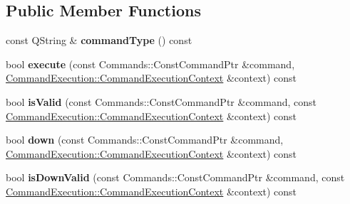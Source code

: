 \subsection*{Public Member Functions}
\begin{DoxyCompactItemize}
\item 
\mbox{\label{class_q_sql_migrator_1_1_command_execution_1_1_custom_command_service_a8c7a42129a19d3121fbfcc5d710b666d}} 
const Q\+String \& {\bfseries command\+Type} () const
\item 
\mbox{\label{class_q_sql_migrator_1_1_command_execution_1_1_custom_command_service_a66b40615960798c7f31f351a88b9af7f}} 
bool {\bfseries execute} (const Commands\+::\+Const\+Command\+Ptr \&command, \hyperlink{class_q_sql_migrator_1_1_command_execution_1_1_command_execution_context}{Command\+Execution\+::\+Command\+Execution\+Context} \&context) const
\item 
\mbox{\label{class_q_sql_migrator_1_1_command_execution_1_1_custom_command_service_ace5d51ff7b7540280e6ad13e37320229}} 
bool {\bfseries is\+Valid} (const Commands\+::\+Const\+Command\+Ptr \&command, const \hyperlink{class_q_sql_migrator_1_1_command_execution_1_1_command_execution_context}{Command\+Execution\+::\+Command\+Execution\+Context} \&context) const
\item 
\mbox{\label{class_q_sql_migrator_1_1_command_execution_1_1_custom_command_service_af785f29b6fc631ada9c4da6f2e234c81}} 
bool {\bfseries down} (const Commands\+::\+Const\+Command\+Ptr \&command, \hyperlink{class_q_sql_migrator_1_1_command_execution_1_1_command_execution_context}{Command\+Execution\+::\+Command\+Execution\+Context} \&context) const
\item 
\mbox{\label{class_q_sql_migrator_1_1_command_execution_1_1_custom_command_service_aa9921ce36db13f600d2509a46d9f00c9}} 
bool {\bfseries is\+Down\+Valid} (const Commands\+::\+Const\+Command\+Ptr \&command, const \hyperlink{class_q_sql_migrator_1_1_command_execution_1_1_command_execution_context}{Command\+Execution\+::\+Command\+Execution\+Context} \&context) const
\end{DoxyCompactItemize}
